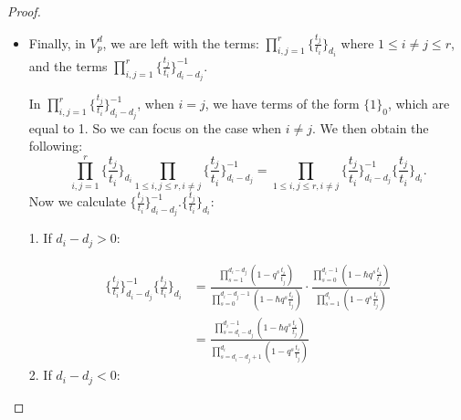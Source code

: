 \documentclass[10pt,a4paper]{amsart}
\begin{document}
\begin{proof}
\begin{itemize}
       Now, we examine $\mathcal{B}_{-q^{-1}\hbar}(I(t;q,Q)_{\arrowvert_{p}})$. In $\mathcal{B}_{y}(I(t;q,Q)_{\arrowvert_{p}})$, we have the terms: 
       \[
       \frac{\prod_{i=1}^r \prod_{j=r+1}^n\prod_{s=1}^{d_i}(1+yq^{s}\frac{t_i}{t_j})}{\prod_{i=1}^r \prod_{j=r+1}^n\prod_{s=1}^{d_i}(1-q^{s}\frac{t_i}{t_j})} 
       \]
       Hence, the corresponding term in $\mathcal{B}_{q^{-1}y}(I(t;q,Q)_{\arrowvert_{p}})$ will be:

       \[
       \frac{\prod_{i=1}^r \prod_{j=r+1}^n\prod_{s=1}^{d_i}(1+yq^{s-1}\frac{t_i}{t_j})}{\prod_{i=1}^r \prod_{j=r+1}^n\prod_{s=1}^{d_i}(1-q^{s}\frac{t_i}{t_j})} = \frac{\prod_{i=1}^r \prod_{j=r+1}^n\prod_{s=0}^{d_i-1}(1+yq^{s}\frac{t_i}{t_j})}{\prod_{i=1}^r \prod_{j=r+1}^n\prod_{s=1}^{d_i}(1-q^{s}\frac{t_i}{t_j})}
       \]
       Thus, after the change of variables $y=-\hbar$, the terms in $V_p^d$ and $\mathcal{B}_{-q^{-1}\hbar}(I(t;q,Q)_{\arrowvert_{p}})$ are also equal.

       \item Finally, in $V_p^d$, we are left with the terms: $\prod_{i,j=1}^r\{\frac{t_j}{t_i}\}_{d_i}$ where $1 \leq i \ne j \leq r$, and the terms $\prod_{i,j=1}^r\{\frac{t_j}{t_i}\}_{d_i-d_j}^{-1}$. 
       
       In $\prod_{i,j=1}^r\{\frac{t_j}{t_i}\}_{d_i-d_j}^{-1}$, when $i=j$, we have terms of the form $\{1\}_0$, which are equal to 1. So we can focus on the case when $i \ne j$. We then obtain the following:
       \[
\prod_{i,j=1}^r\{\frac{t_j}{t_i}\}_{d_i}\prod_{1 \le i,j \le r, i \ne j}\{\frac{t_j}{t_i}\}_{d_i-d_j}^{-1} = \prod_{1 \le i,j \le r, i \ne j}\{\frac{t_j}{t_i}\}_{d_i-d_j}^{-1}\{\frac{t_j}{t_i}\}_{d_i}.
       \]
       Now we calculate $\{\frac{t_j}{t_i}\}_{d_i-d_j}^{-1}.\{\frac{t_j}{t_i}\}_{d_i}$:
       
        1. If $d_i-d_j > 0:$

        \begin{align*}
           \{\frac{t_j}{t_i}\}_{d_i-d_j}^{-1}\{\frac{t_j}{t_i}\}_{d_i} &= \frac{\prod_{s=1}^{d_i-d_j}(1-q^s\frac{t_i}{t_j})}{\prod_{s=0}^{d_i-d_j-1}(1-\hbar q^s \frac{t_i}{t_j})} \cdot\frac{\prod_{s=0}^{d_i-1}(1-\hbar q^s\frac{t_i}{t_j})}{\prod_{s=1}^{d_i}(1-q^s \frac{t_i}{t_j})}  \\&= \frac{\prod_{s=d_i-d_j}^{d_i-1}(1-\hbar q^s \frac{t_i}{t_j})}{\prod_{s=d_i-d_j+1}^{d_i}(1-q^s \frac{t_i}{t_j})}
        \end{align*}
        2. If $d_i-d_j < 0:$


\end{itemize}
\end{proof}
\end{document}
